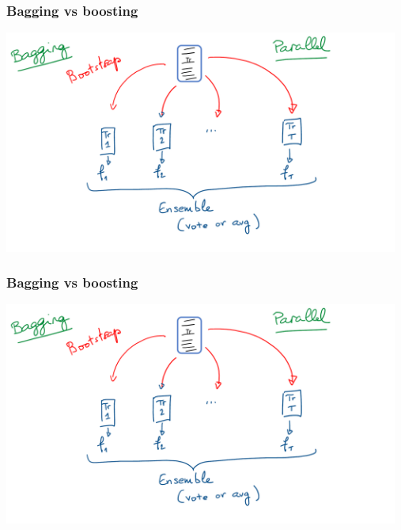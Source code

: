 \begin{frame}
\frametitle{Bagging vs boosting}
\includegraphics[width=13cm, page=1]{../Graphs/Bagging_Boosting_Illustrations.pdf}
\end{frame}
\begin{frame}
\frametitle{Bagging vs boosting}
\includegraphics[width=13cm, page=2]{../Graphs/Bagging_Boosting_Illustrations.pdf}
\end{frame}

